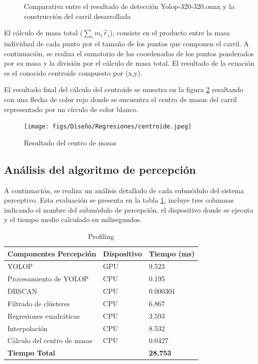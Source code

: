 \begin{figure}[H]
  \caption{Comparativa entre el resultado de detección Yolop-320-320.onnx y la construcción del carril desarrollada}
  \label{comparativa-interpolacion}
\end{figure}



  El cálculo de masa total ($\sum_{i}m_{i} \vec{r}_{i}$), consiste en el producto entre la masa individual de cada punto por el tamaño de los puntos que componen el carril. A continuación, 
  se realiza el sumatorio de las coordenadas de los puntos ponderados por su masa y la división por el cálculo de masa total. El resultado de la ecuación es el conocido centroide 
  compuesto por (x,y). \newline
  
  El resultado final del cálculo del centroide se muestra en la figura \ref{fig:centro de masas} resaltando con una flecha de color rojo donde se encuentra
  el centro de masas del carril representado por un círculo de color blanco.

  \begin{figure} [H]
    \begin{center}
      \texttt{[image: figs/Diseño/Regresiones/centroide.jpeg]}
    \end{center}
    \caption{Resultado del centro de masas}
    \label{fig:centro de masas}
  \end{figure}

  \subsection{Análisis del algoritmo de percepción}
  \label{sec:Análisis del algoritmo de percepción}
  A continuación, se realiza un análisis detallado de cada submódulo del sistema perceptivo. Esta evaluación se presenta en la tabla \ref{tab:Profiling}, incluye 
  tres columnas indicando el nombre del submódulo de percepción, el dispositivo donde se ejecuta y el tiempo medio calculado en milisegundos.

\begin{table}[h]
    \centering
    \begin{tabular}{| m{5cm} | m{3cm} | m{3cm} |}
        \hline
        \textbf{Componentes Percepción} & \textbf{Dispositivo} & \textbf{Tiempo (ms)} \\ \hline
        YOLOP & GPU & 9.523 \\ \hline
        Procesamiento de YOLOP & CPU & 0.195 \\ \hline
        DBSCAN & CPU & 0.000301 \\ \hline
        Filtrado de clústeres & CPU & 6.867 \\ \hline
        Regresiones cuadráticas & CPU & 3.593 \\ \hline
        Interpolación & CPU & 8.532 \\ \hline
        Cálculo del centro de masas & CPU & 0.0427 \\ \hline
        \textbf{Tiempo Total} & & \textbf{28.753} \\ \hline
    \end{tabular}
    \caption{Profiling}
    \label{tab:Profiling}
\end{table}

